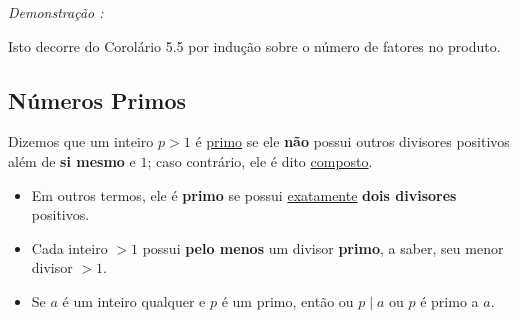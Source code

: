         \textit{Demonstração : }

            Isto decorre do Corolário 5.5 por indução sobre o número de fatores no produto.

    \subsection{Números Primos}

        \begin{definicao}
            Dizemos que um inteiro $p > 1$ é \underline{primo} se ele \textbf{não} possui outros divisores positivos além 
            de \textbf{si mesmo} e $1$; caso contrário, ele é dito \underline{composto}.  
        \end{definicao}

        \begin{itemize}[left=0.5cm, align=left, nosep]
            \item Em outros termos, ele é \textbf{primo} se possui \underline{exatamente} \textbf{dois divisores} positivos. 
            \item Cada inteiro $> 1$ possui \textbf{pelo menos} um divisor \textbf{primo}, a saber, seu menor divisor $> 1$. 
            \item Se $a$ é um inteiro qualquer e $p$ é um primo, então ou $p \mid a$ ou $p$ é primo a $a$. 
        \end{itemize}

